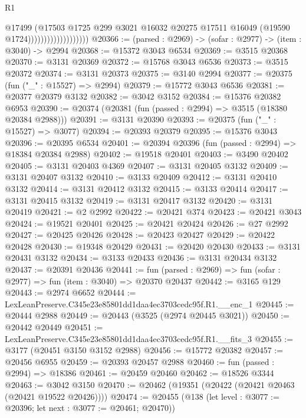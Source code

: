 \begin{lexlean}{R1}
\begin{coremodule}
                                      @17499
                                      (@17503
                                        @1725
                                        @299
                                        @3021
                                        @16032
                                        @20275
                                        @17511
                                        @16049
                                        (@19590 @1724)))))))))))))))))))
@20366 := (parsed : @2969) -> (sofar : @2977) -> (item : @3040) -> @2994
@20368 := @15372 @3043 @6534
@20369 := @3515 @20368
@20370 := @3131 @20369
@20372 := @15768 @3043 @6536
@20373 := @3515 @20372
@20374 := @3131 @20373
@20375 := @3140 @2994
@20377 := @20375 (fun ("_" : @15527) => @2994)
@20379 := @15772 @3043 @6536
@20381 := @20377 @20379 @3132
@20382 := @3042 @3152
@20384 := @15376 @20382 @6953
@20390 := @20374 (@20381 (fun (passed : @2994) => @3515 (@18380 @20384 @2988)))
@20391 := @3131 @20390
@20393 := @20375 (fun ("_" : @15527) => @3077)
@20394 := @20393 @20379
@20395 := @15376 @3043
@20396 := @20395 @6534
@20401 := @20394 @20396 (fun (passed : @2994) => @18384 @20384 @2988)
@20402 := @19518 @20401
@20403 := @3490 @20402
@20405 := @3131 @20403 @4369
@20407 := @3131 @20405 @3132
@20409 := @3131 @20407 @3132
@20410 := @3133 @20409
@20412 := @3131 @20410 @3132
@20414 := @3131 @20412 @3132
@20415 := @3133 @20414
@20417 := @3131 @20415 @3132
@20419 := @3131 @20417 @3132
@20420 := @3131 @20419
@20421 := @2 @2992
@20422 := @20421 @374
@20423 := @20421 @3043
@20424 := @19521 @20401
@20425 := @20421 @20424
@20426 := @27 @2992
@20427 := @20425 @20426
@20428 := @20423 @20427
@20429 := @20422 @20428
@20430 := @19348 @20429
@20431 := @20420 @20430
@20433 := @3131 @20431 @3132
@20434 := @3133 @20433
@20436 := @3131 @20434 @3132
@20437 := @20391 @20436
@20441 := fun (parsed : @2969) => fun (sofar : @2977) => fun (item : @3040) => @20370 @20437
@20442 := @3165 @129
@20443 := @2974 @6652
@20444 := LexLeanPreserve.C345e23e85801dd1daa4ec3703cedc95f.R1.__enc_1
@20445 := @20444 @2988
@20449 := @20443 (@3525 (@2974 @20445 @3021))
@20450 := @20442 @20449
@20451 := LexLeanPreserve.C345e23e85801dd1daa4ec3703cedc95f.R1.__fits_3
@20455 := @3177 (@20451 @3150 @3152 @2988)
@20456 := @15772 @20382
@20457 := @20456 @6955
@20459 := @20393 @20457 @2988
@20460 := fun (passed : @2994) => @18386
@20461 := @20459 @20460
@20462 := @18526 @3344
@20463 := @3042 @3150
@20470 := @20462 (@19351 (@20422 (@20421 @20463 (@20421 @19522 @20426))))
@20474 := @20455 (@138 (let level : @3077 := @20396; let next : @3077 := @20461; @20470))

\end{coremodule}
\end{lexlean}
